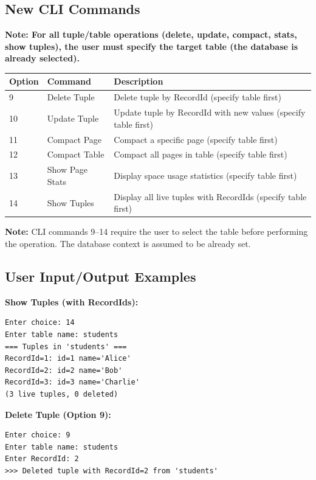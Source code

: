 \documentclass[11pt,a4paper]{article}
\begin{document}
\subsection{New CLI Commands}

\textbf{Note: For all tuple/table operations (delete, update, compact, stats, show tuples), the user must specify the target table (the database is already selected).}

\begin{table}[H]
\centering
\begin{tabular}{@{}lll@{}}
\toprule
\textbf{Option} & \textbf{Command} & \textbf{Description} \\
\midrule
9 & Delete Tuple & Delete tuple by RecordId (specify table first) \\
10 & Update Tuple & Update tuple by RecordId with new values (specify table first) \\
11 & Compact Page & Compact a specific page (specify table first) \\
12 & Compact Table & Compact all pages in table (specify table first) \\
13 & Show Page Stats & Display space usage statistics (specify table first) \\
14 & Show Tuples & Display all live tuples with RecordIds (specify table first) \\
\bottomrule
\end{tabular}
\end{table}

\textbf{Note:} CLI commands 9--14 require the user to select the table before performing the operation. The database context is assumed to be already set.

\subsection{User Input/Output Examples}

\textbf{Show Tuples (with RecordIds):}
\begin{lstlisting}
Enter choice: 14
Enter table name: students
=== Tuples in 'students' ===
RecordId=1: id=1 name='Alice'
RecordId=2: id=2 name='Bob'
RecordId=3: id=3 name='Charlie'
(3 live tuples, 0 deleted)
\end{lstlisting}

\textbf{Delete Tuple (Option 9):}
\begin{lstlisting}
Enter choice: 9
Enter table name: students
Enter RecordId: 2
>>> Deleted tuple with RecordId=2 from 'students'
\end{lstlisting}
\end{document}
